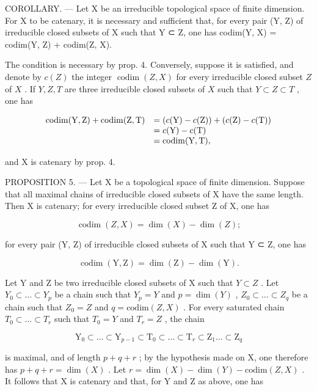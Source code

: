 COROLLARY. — Let X be an irreducible topological space of finite dimension. For X to be catenary, it is necessary and sufficient that, for every pair (Y, Z) of irreducible closed subsets of X such that Y ⊂ Z, one has codim(Y, X) = codim(Y, Z) + codim(Z, X).

The condition is necessary by prop. 4. Conversely, suppose it is satisfied, and denote by \(c(Z)\) the integer \(\operatorname{codim}(Z,X)\) for every irreducible closed subset \(Z\) of \(X\) . If \(Y,Z,T\) are three irreducible closed subsets of \(X\) such that \(Y\subset Z\subset T\) , one has

\[
\begin{array}{r l} \operatorname{codim} (\mathrm{Y}, \mathrm{Z}) + \operatorname{codim} (\mathrm{Z}, \mathrm{T}) & = (c (\mathrm{Y}) - c (\mathrm{Z})) + (c (\mathrm{Z}) - c (\mathrm{T})) \\ & = c (\mathrm{Y}) - c (\mathrm{T}) \\ & = \operatorname{codim} (\mathrm{Y}, \mathrm{T}), \end{array}
\]

and X is catenary by prop. 4.

PROPOSITION 5. — Let X be a topological space of finite dimension. Suppose that all maximal chains of irreducible closed subsets of X have the same length. Then X is catenary; for every irreducible closed subset Z of X, one has

\[
\operatorname{codim} (Z, X) = \dim (X) - \dim (Z);
\]

for every pair (Y, Z) of irreducible closed subsets of X such that Y ⊂ Z, one has

\[
\operatorname{codim} (\mathrm{Y}, \mathrm{Z}) = \dim (\mathrm{Z}) - \dim (\mathrm{Y}).
\]

Let Y and Z be two irreducible closed subsets of X such that \(Y \subset Z\) . Let \(Y_{0} \subset \ldots \subset Y_{p}\) be a chain such that \(Y_{p} = Y\) and \(p = \dim(Y)\) , \(Z_{0} \subset \ldots \subset Z_{q}\) be a chain such that \(Z_{0} = Z\) and \(q = \text{codim}(Z, X)\) . For every saturated chain \(T_{0} \subset \ldots \subset T_{r}\) such that \(T_{0} = Y\) and \(T_{r} = Z\) , the chain

\[
\mathrm{Y} _ {0} \subset \dots \subset \mathrm{Y} _ {p - 1} \subset \mathrm{T} _ {0} \subset \dots \subset \mathrm{T} _ {r} \subset \mathrm{Z} _ {1} \dots \subset \mathrm{Z} _ {q}
\]

is maximal, and of length \(p + q + r\) ; by the hypothesis made on X, one therefore has \(p + q + r = \dim(X)\) . Let \(r = \dim(X) - \dim(Y) - \text{codim}(Z, X)\) . It follows that X is catenary and that, for Y and Z as above, one has

